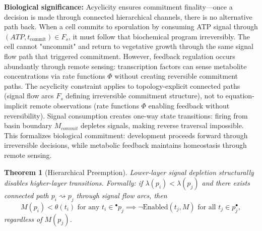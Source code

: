 \documentclass[10pt,letterpaper]{article}
\newtheorem{theorem}{Theorem}
\begin{document}
\textbf{Biological significance:} Acyclicity ensures commitment finality---once a decision is made through connected hierarchical channels, there is no alternative path back. When a cell commits to sporulation by consuming ATP signal through $(ATP, t_{\text{commit}}) \in F_s$, it must follow that biochemical program irreversibly. The cell cannot "uncommit" and return to vegetative growth through the same signal flow path that triggered commitment. However, feedback regulation occurs abundantly through remote sensing: transcription factors can sense metabolite concentrations via rate functions $\Phi$ without creating reversible commitment paths. The acyclicity constraint applies to topology-explicit connected paths (signal flow arcs $F_s$ defining irreversible commitment structure), not to equation-implicit remote observations (rate functions $\Phi$ enabling feedback without reversibility). Signal consumption creates one-way state transitions: firing from basin boundary $M_{commit}$ depletes signals, making reverse traversal impossible. This formalizes biological commitment: development proceeds forward through irreversible decisions, while metabolic feedback maintains homeostasis through remote sensing.

\begin{theorem}[Hierarchical Preemption]
Lower-layer signal depletion structurally disables higher-layer transitions. Formally: if $\lambda(p_i) < \lambda(p_j)$ and there exists connected path $p_i \rightsquigarrow p_j$ through signal flow arcs, then
\[
M(p_i) < \theta(t_i) \text{ for any } t_i \in {}^\bullet p_j \implies \neg\text{Enabled}(t_j, M) \text{ for all } t_j \in p_j^\bullet,
\]
regardless of $M(p_j)$.
\end{theorem}
\end{document}
